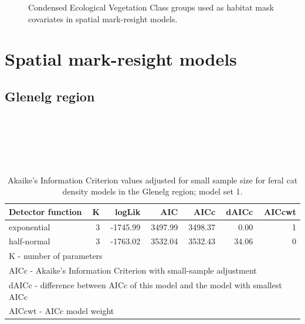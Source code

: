 \documentclass[11pt,a4paper,titlepage,twoside,openright]{style/unimelbthesis}
\begin{document}
\begin{mainmatter}
\begin{figure}
{}

\caption{Condensed Ecological Vegetation Class groups used as habitat mask covariates in spatial mark-resight models.}\label{fig:density-veg}
\end{figure}
\newpage

\hypertarget{spatial-mark-resight-models}{%
\section{Spatial mark-resight models}\label{spatial-mark-resight-models}}

\hypertarget{glenelg-region-5}{%
\subsection{Glenelg region}\label{glenelg-region-5}}

\(~\)

\(~\)

\(~\)

\begingroup\fontsize{10}{12}\selectfont
\begin{longtable}[t]{lrrrrrr}
\caption{\label{tab:density-aic-g-1}Akaike's Information Criterion values adjusted for small sample size for feral cat density models in the Glenelg region; model set 1.}\\
\toprule
Detector function & K & logLik & AIC & AICc & dAICc & AICcwt\\
\midrule
exponential & 3 & -1745.99 & 3497.99 & 3498.37 & 0.00 & 1\\
half-normal & 3 & -1763.02 & 3532.04 & 3532.43 & 34.06 & 0\\
\bottomrule
\multicolumn{7}{l}{\rule{0pt}{1em}K - number of parameters}\\
\multicolumn{7}{l}{\rule{0pt}{1em}AICc - Akaike's Information Criterion with small-sample adjustment}\\
\multicolumn{7}{l}{\rule{0pt}{1em}dAICc - difference between AICc of this model and the model with smallest AICc}\\
\multicolumn{7}{l}{\rule{0pt}{1em}AICcwt - AICc model weight}\\
\end{longtable}
\endgroup{}

\newpage

\(~\)

\(~\)

\(~\)


\end{mainmatter}
\end{document}
